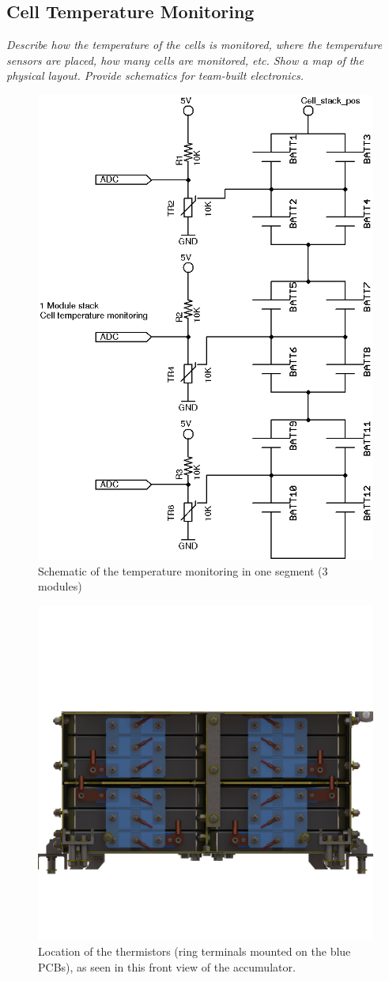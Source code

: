 \documentclass{article}
\begin{document}
\subsection{Cell Temperature Monitoring} \label{celltopsection}

    \textit{Describe how the temperature of the cells is monitored, where the temperature sensors are placed, how many cells are monitored, etc. Show a map of the physical layout. Provide schematics for team-built electronics.}


        \begin{figure}[H]
            \centering
            \includegraphics[width = 0.4 \textwidth]{celltemp}
            \caption{Schematic of the temperature monitoring in one segment (3 modules)}
            \label{celltemp}
        \end{figure}

        \begin{figure}[H]
            \centering
            \includegraphics[width = 0.6 \textwidth]{bus-bar_configuration}
            \caption{Location of the thermistors (ring terminals mounted on the blue PCBs), as seen in this front view of the accumulator.}
            \label{celltemplocation}
        \end{figure}
\end{document}
